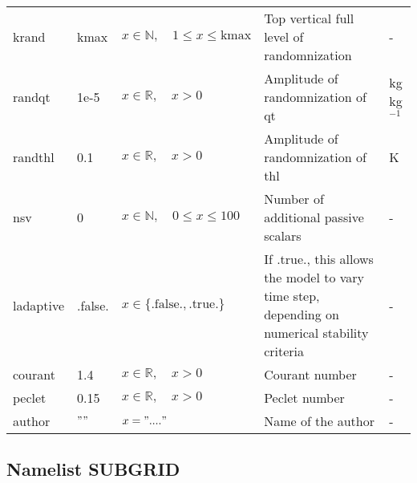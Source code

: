 \documentclass[twoside,11pt,fleqn,a4paper,english,openright]{report}
\begin{document}
\begin{center}
\begin{supertabular}{|l|p{1.6cm}|p{4.4cm}|p{6cm}|l|}
  krand		& kmax		& $x \in \mathbb{N}, \quad 1 \leq x \leq \text{kmax}$		& Top vertical full level of randomnization 	& -\\
  randqt	& 1e-5		& $x \in \mathbb{R}, \quad x>0$		& Amplitude of randomnization of qt		& kg kg$^{-1}$\\
  randthl	& 0.1		& $x \in \mathbb{R}, \quad x>0$		& Amplitude of randomnization of thl		& K\\
  nsv		& 0		& $x \in \mathbb{N}, \quad 0 \leq x \leq 100$	& Number of additional passive scalars		& -\\
  ladaptive	& .false.	& $x\in\{\text{.false.},\text{.true.}\}$		& If .true., this allows the model to vary time step, depending on numerical stability criteria				& -\\
  courant	& 1.4	& $x \in \mathbb{R}, \quad x>0$		& Courant number				& -\\
  peclet	& 0.15 & $x \in \mathbb{R}, \quad x>0$		& Peclet number					& -\\	
  author	& $""$	& $x = "...."$	& Name of the author & -\\
\end{supertabular}
\end{center}

\subsection{Namelist SUBGRID}\label{par:subgrid}
\end{document}

